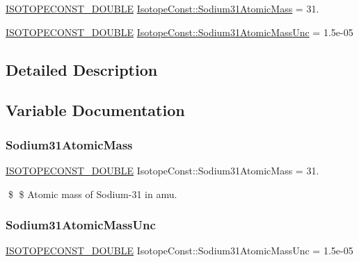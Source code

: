 \begin{DoxyCompactItemize}
\item 
\mbox{\hyperlink{group___isotope_const-_macros_ga8f45a7272ce02c0b4c65c44636ed719a}{I\+S\+O\+T\+O\+P\+E\+C\+O\+N\+S\+T\+\_\+\+D\+O\+U\+B\+LE}} \mbox{\hyperlink{group___isotope_const-_sodium-_na31_gaddb194a6f3691769b9d2e675cee9e866}{Isotope\+Const\+::\+Sodium31\+Atomic\+Mass}} = 31.
\item 
\mbox{\hyperlink{group___isotope_const-_macros_ga8f45a7272ce02c0b4c65c44636ed719a}{I\+S\+O\+T\+O\+P\+E\+C\+O\+N\+S\+T\+\_\+\+D\+O\+U\+B\+LE}} \mbox{\hyperlink{group___isotope_const-_sodium-_na31_ga81570584a96908987976cf682baaf6e8}{Isotope\+Const\+::\+Sodium31\+Atomic\+Mass\+Unc}} = 1.\+5e-\/05
\end{DoxyCompactItemize}


\subsection{Detailed Description}


\subsection{Variable Documentation}
\mbox{\label{group___isotope_const-_sodium-_na31_gaddb194a6f3691769b9d2e675cee9e866}} 
\subsubsection{\texorpdfstring{Sodium31\+Atomic\+Mass}{Sodium31AtomicMass}}
{\footnotesize\ttfamily \mbox{\hyperlink{group___isotope_const-_macros_ga8f45a7272ce02c0b4c65c44636ed719a}{I\+S\+O\+T\+O\+P\+E\+C\+O\+N\+S\+T\+\_\+\+D\+O\+U\+B\+LE}} Isotope\+Const\+::\+Sodium31\+Atomic\+Mass = 31.}

\$ \$ Atomic mass of Sodium-\/31 in amu. \mbox{\label{group___isotope_const-_sodium-_na31_ga81570584a96908987976cf682baaf6e8}} 
\subsubsection{\texorpdfstring{Sodium31\+Atomic\+Mass\+Unc}{Sodium31AtomicMassUnc}}
{\footnotesize\ttfamily \mbox{\hyperlink{group___isotope_const-_macros_ga8f45a7272ce02c0b4c65c44636ed719a}{I\+S\+O\+T\+O\+P\+E\+C\+O\+N\+S\+T\+\_\+\+D\+O\+U\+B\+LE}} Isotope\+Const\+::\+Sodium31\+Atomic\+Mass\+Unc = 1.\+5e-\/05}

